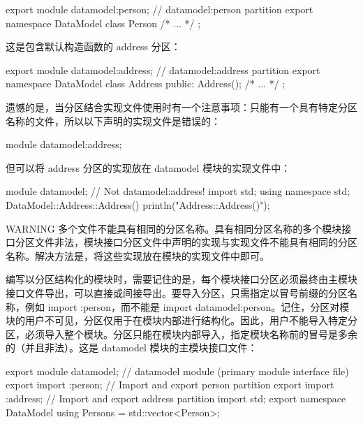 \begin{cpp}
export module datamodel:person; // datamodel:person partition
export namespace DataModel { class Person { /* ... */ }; }
\end{cpp}

这是包含默认构造函数的 address 分区：

\begin{cpp}
export module datamodel:address; // datamodel:address partition
export namespace DataModel
{
    class Address
    {
        public:
        Address();
        /* ... */
    };
}
\end{cpp}

遗憾的是，当分区结合实现文件使用时有一个注意事项：只能有一个具有特定分区名称的文件，所以以下声明的实现文件是错误的：

\begin{cpp}
module datamodel:address;
\end{cpp}

但可以将 address 分区的实现放在 datamodel 模块的实现文件中：

\begin{cpp}
module datamodel; // Not datamodel:address!
import std;
using namespace std;
DataModel::Address::Address() { println("Address::Address()"); }
\end{cpp}

\begin{myWarning}{WARNING}
多个文件不能具有相同的分区名称。具有相同分区名称的多个模块接口分区文件非法，模块接口分区文件中声明的实现与实现文件不能具有相同的分区名称。解决方法是，将这些实现放在模块的实现文件中即可。
\end{myWarning}

编写以分区结构化的模块时，需要记住的是，每个模块接口分区必须最终由主模块接口文件导出，可以直接或间接导出。要导入分区，只需指定以冒号前缀的分区名称，例如 import :person，而不能是 import datamodel:person。记住，分区对模块的用户不可见，分区仅用于在模块内部进行结构化。因此，用户不能导入特定分区，必须导入整个模块。分区只能在模块内部导入，指定模块名称前的冒号是多余的（并且非法）。这是 datamodel 模块的主模块接口文件：

\begin{cpp}
export module datamodel; // datamodel module (primary module interface file)
export import :person; // Import and export person partition
export import :address; // Import and export address partition
import std;
export namespace DataModel { using Persons = std::vector<Person>; }
\end{cpp}

